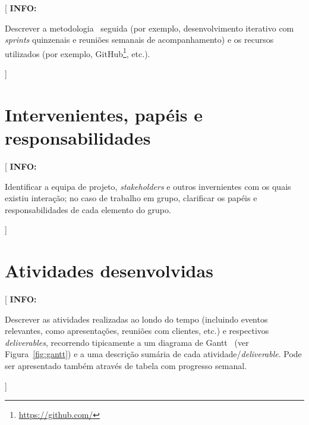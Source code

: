 \documentclass[11pt,a4paper]{report}
\newenvironment{info}[1]{\vspace*{6mm}\color{blue}[ \textbf{INFO:} \begin{em} #1}
                        {\vspace*{3mm}\end{em} ]}
\begin{document}
\begin{info}
Descrever a metodologia~\cite{despa2014comparative} seguida (por
exemplo, desenvolvimento iterativo com \emph{sprints} quinzenais e reuniões
semanais de acompanhamento) e os recursos utilizados (por exemplo,
GitHub\footnote{\url{https://github.com/}}, etc.). 
\end{info}

\section{Intervenientes, papéis e responsabilidades}

\begin{info}
Identificar a equipa de projeto, \emph{stakeholders} e outros invernientes com os quais existiu interação; no caso de trabalho em grupo, clarificar os papéis e responsabilidades de cada elemento do grupo.
\end{info}

\section{Atividades desenvolvidas}

\begin{info}
Descrever as atividades realizadas ao londo do tempo (incluindo eventos relevantes, como apresentações, reuniões com clientes, etc.) e respectivos \emph{deliverables}, recorrendo tipicamente a um diagrama de Gantt~\cite{gantt} (ver Figura~\ref{fig:gantt}) e a uma descrição sumária de cada atividade/\emph{deliverable}.
Pode ser apresentado também através de tabela com progresso semanal.
\end{info}
\end{document}
